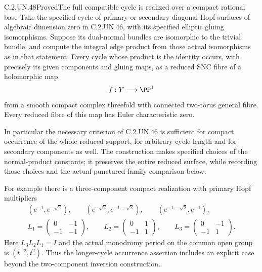 \begin{statement}{C.2.UN.48}{Proved}{The full compatible cycle is realized over a compact rational base}
Take the specified cycle of primary or secondary diagonal
Hopf surfaces of algebraic dimension zero in C.2.UN.46,
with its specified elliptic gluing isomorphisms.
Suppose its dual-normal bundles are isomorphic to the
trivial bundle, and compute the integral edge product
from those actual isomorphisms as in that statement.
Every cycle whose product is the identity occurs,
with precisely its given components and gluing maps,
as a reduced SNC fibre of a holomorphic map
\[
                 f:Y\longrightarrow\PP^1
\]
from a smooth compact complex threefold with connected
two-torus general fibre. Every reduced fibre of this
map has Euler characteristic zero.

In particular the necessary criterion of C.2.UN.46
is sufficient for compact occurrence of the whole
reduced support, for arbitrary cycle length and for
secondary components as well. The construction makes
specified choices of the normal-product constants;
it preserves the entire reduced surface, while
recording those choices and the actual punctured-family
comparison below.

For example there is a three-component compact
realization with primary Hopf multipliers
\[
 \begin{gathered}
 (e^{-1},e^{-\sqrt2}),\qquad
 (e^{-\sqrt2},e^{-1-\sqrt2}),\qquad
 (e^{-1-\sqrt2},e^{-1}),\\
 L_1=\begin{pmatrix}0&-1\\-1&-1\end{pmatrix},\qquad
 L_2=\begin{pmatrix}0&1\\-1&1\end{pmatrix},\qquad
 L_3=\begin{pmatrix}0&-1\\-1&1\end{pmatrix}.
 \end{gathered}
 \tag{C.HG.1}
\]
Here $L_3L_2L_1=I$ and the actual monodromy period
on the common open group is $(t^{-2},t^2)$.
Thus the longer-cycle occurrence assertion includes
an explicit case beyond the two-component inversion
construction.
\end{statement}

